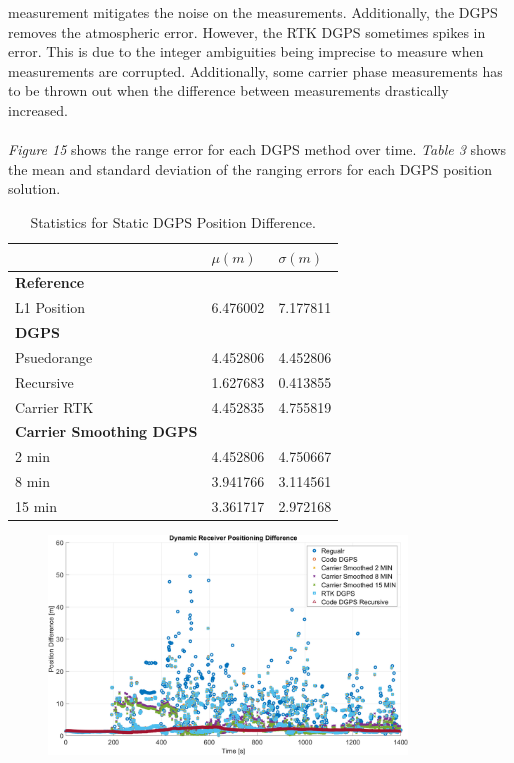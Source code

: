 \documentclass[11pt]{article}
\begin{document}
\begin{enumerate}[label=\textbf{\arabic*.}]
      measurement mitigates the noise on the measurements. Additionally, the DGPS removes 
      the atmospheric error. However, the RTK DGPS sometimes spikes in error. This is due to 
      the integer ambiguities being imprecise to measure when measurements are corrupted. 
      Additionally, some carrier phase measurements has to be thrown out when the difference 
      between measurements drastically increased. 
      \\ \\
      \emph{Figure 15} shows the range error for each DGPS method over time. \emph{Table 3} 
      shows the mean and standard deviation of the ranging errors for each DGPS position 
      solution.
      \begin{table}[H]
        \centering
        \caption{Statistics for Static DGPS Position Difference.}
        \begin{tabular}{ P{5cm}|P{3cm} P{3cm} }
          & \boldmath$\mu (m)$ & \boldmath$\sigma (m)$ \\
          \hline
          \textbf{Reference} &  \\
          L1 Position & 6.476002 & 7.177811 \\
          \hline
          \textbf{DGPS} &  \\
          Psuedorange & 4.452806 & 4.452806 \\
          Recursive & 1.627683 & 0.413855 \\
          Carrier RTK & 4.452835 & 4.755819 \\
          \hline
          \textbf{Carrier Smoothing DGPS} &  \\
          2 min & 4.452806 & 4.750667 \\
          8 min & 3.941766 & 3.114561 \\
          15 min & 3.361717 & 2.972168
        \end{tabular}
      \end{table}
      \begin{figure}[H]
          \centering
          \includegraphics[width=0.85\textwidth]{p3_comp.png}

\end{figure}
\end{enumerate}
\end{document}
